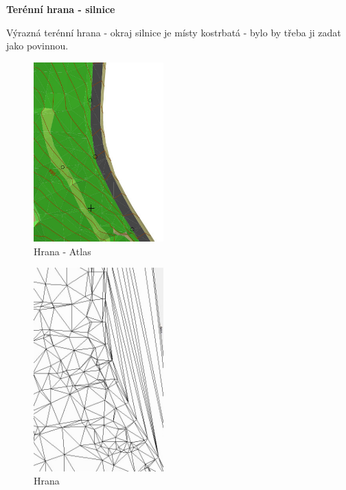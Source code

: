 \documentclass[a4paper, 12pt]{article}
\begin{document}
\textbf{Terénní hrana - silnice}

Výrazná terénní hrana - okraj silnice je místy kostrbatá - bylo by třeba ji zadat jako povinnou.

\begin{figure}[h]
	\centering
	\includegraphics[width=5cm]{hrana_atlas.jpg}
	\caption{Hrana - Atlas}
\end{figure}

\begin{figure}[h]
	\centering
	\includegraphics[width=5cm]{hrana_nase.jpg}
	\caption{Hrana}
\end{figure}

\clearpage
\end{document}
